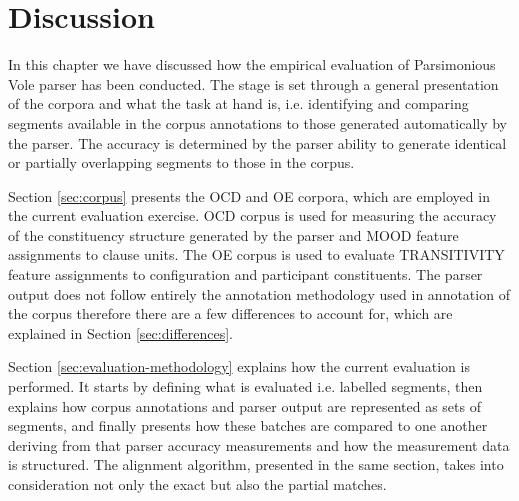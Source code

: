     
    

\section{Discussion}
\label{sec:evaluation-discussion}
    
    In this chapter we have discussed how the empirical evaluation of Parsimonious Vole parser has been conducted. The stage is set through a general presentation of the corpora and what the task at hand is, i.e. identifying and comparing segments available in the corpus annotations to those generated automatically by the parser. The accuracy is determined by the parser ability to generate identical or partially overlapping segments to those in the corpus.
    
    Section \ref{sec:corpus} presents the OCD and OE corpora, which are employed in the current evaluation exercise. OCD corpus is used for measuring the accuracy of the constituency structure generated by the parser and MOOD feature assignments to clause units. The OE corpus is used to evaluate TRANSITIVITY feature assignments to configuration and participant constituents. The parser output does not follow entirely the annotation methodology used in annotation of the corpus therefore there are a few differences to account for, which are explained in Section \ref{sec:differences}. 
    
    Section \ref{sec:evaluation-methodology} explains how the current evaluation is performed. It starts by defining what is evaluated i.e. labelled segments, then explains how corpus annotations and parser output are represented as sets of segments, and finally presents how these batches are compared to one another deriving from that parser accuracy measurements and how the measurement data is structured. The alignment algorithm, presented in the same section, takes into consideration not only the exact but also the partial matches. %
    
